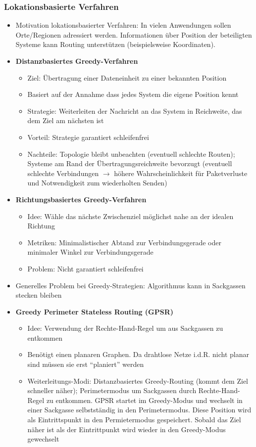 \subsubsection{Lokationsbasierte Verfahren}
\begin{itemize}
	\item Motivation lokationsbasierter Verfahren: In vielen Anwendungen sollen Orte/Regionen adressiert werden. Informationen über Position der beteiligten Systeme kann Routing unterstützen (beispielsweise Koordinaten).
	\item \textbf{Distanzbasiertes Greedy-Verfahren}
	\begin{itemize}
		\item Ziel: Übertragung einer Dateneinheit zu einer bekannten Position
		\item Basiert auf der Annahme dass jedes System die eigene Position kennt
		\item Strategie: Weiterleiten der Nachricht an das System in Reichweite, das dem Ziel am nächsten ist
		\item Vorteil: Strategie garantiert schleifenfrei
		\item Nachteile: Topologie bleibt unbeachten (eventuell schlechte Routen); Systeme am Rand der Übertragungsreichweite bevorzugt (eventuell schlechte Verbindungen \(\rightarrow\) höhere Wahrscheinlichkeit für Paketverluste und Notwendigkeit zum wiederholten Senden)
	\end{itemize}
	\item \textbf{Richtungsbasiertes Greedy-Verfahren}
	\begin{itemize}
		\item Idee: Wähle das nächste Zwischenziel möglichst nahe an der idealen Richtung
		\item Metriken: Minimalistischer Abtand zur Verbindungsgerade oder minimaler Winkel zur Verbindungsgerade
		\item Problem: Nicht garantiert schleifenfrei
	\end{itemize}
	\item Generelles Problem bei Greedy-Strategien: Algorithmus kann in Sackgassen stecken bleiben
	\item \textbf{Greedy Perimeter Stateless Routing (GPSR)}
	\begin{itemize}
		\item Idee: Verwendung der Rechte-Hand-Regel um aus Sackgassen zu entkommen
		\item Benötigt einen planaren Graphen. Da drahtlose Netze i.d.R. nicht planar sind müssen sie erst "`planiert"' werden
		\item Weiterleitungs-Modi: Distanzbasiertes Greedy-Routing (kommt dem Ziel schneller näher); Perimetermodus um Sackgassen durch Rechte-Hand-Regel zu entkommen. GPSR startet im Greedy-Modus und wechselt in einer Sackgasse selbstständig in den Perimetermodus. Diese Position wird als Eintrittspunkt in den Permietermodus gespeichert. Sobald das Ziel näher ist als der Eintrittpunkt wird wieder in den Greedy-Modus gewechselt
	\end{itemize}
\end{itemize}

